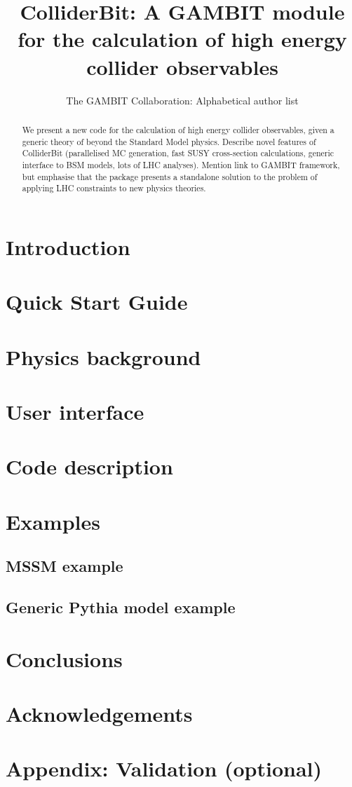 \documentclass[11pt,a4paper]{article}
\title{ColliderBit: A GAMBIT module for the calculation of high energy collider observables}
\author{The GAMBIT Collaboration: Alphabetical author list} %
\begin{document}
\maketitle

\begin{abstract}
We present a new code for the calculation of high energy collider observables, given a generic theory of beyond the Standard Model physics. Describe novel features of ColliderBit (parallelised MC generation, fast SUSY cross-section calculations, generic interface to BSM models, lots of LHC analyses). Mention link to GAMBIT framework, but emphasise that the package presents a standalone solution to the problem of applying LHC constraints to new physics theories.
\end{abstract}

\section{Introduction}


\section{Quick Start Guide}
\label{sec:quickstart}


\section{Physics background}
\label{sec:background}


\section{User interface}
\label{sec:interface}


\section{Code description}
\label{sec:code}


\section{Examples}
\label{sec:examples}


\subsection{MSSM example}


\subsection{Generic Pythia model example}


\section{Conclusions}

\section{Acknowledgements}

\section{Appendix: Validation (optional)}



\end{document}
